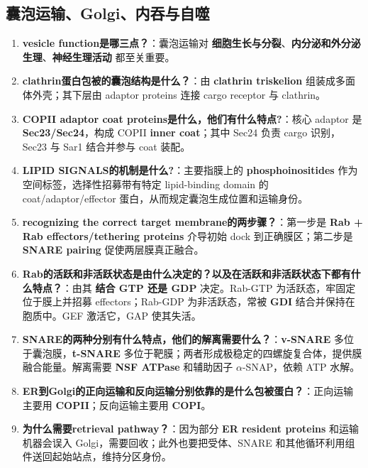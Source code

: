 \documentclass[12pt,fontset=none]{ctexart}
\begin{document}
\subsection*{囊泡运输、Golgi、内吞与自噬}
\begin{enumerate}
\item \textbf{vesicle function是哪三点？}：囊泡运输对 \textbf{细胞生长与分裂}、\textbf{内分泌和外分泌生理}、\textbf{神经生理活动} 都至关重要。

\item \textbf{clathrin蛋白包被的囊泡结构是什么？}：由 \textbf{clathrin triskelion} 组装成多面体外壳；其下层由 adaptor proteins 连接 cargo receptor 与 clathrin。

\item \textbf{COPII adaptor coat proteins是什么，他们有什么特点?}：核心 adaptor 是 \textbf{Sec23/Sec24}，构成 COPII \textbf{inner coat}；其中 Sec24 负责 cargo 识别，Sec23 与 Sar1 结合并参与 coat 装配。

\item \textbf{LIPID SIGNALS的机制是什么?}：主要指膜上的 \textbf{phosphoinositides} 作为空间标签，选择性招募带有特定 lipid-binding domain 的 coat/adaptor/effector 蛋白，从而规定囊泡生成位置和运输身份。

\item \textbf{recognizing the correct target membrane的两步骤？}：第一步是 \textbf{Rab + Rab effectors/tethering proteins} 介导初始 dock 到正确膜区；第二步是 \textbf{SNARE pairing} 促使两层膜真正融合。

\item \textbf{Rab的活跃和非活跃状态是由什么决定的？以及在活跃和非活跃状态下都有什么特点？}：由其 \textbf{结合 GTP 还是 GDP} 决定。Rab-GTP 为活跃态，牢固定位于膜上并招募 effectors；Rab-GDP 为非活跃态，常被 \textbf{GDI} 结合并保持在胞质中。GEF 激活它，GAP 使其失活。

\item \textbf{SNARE的两种分别有什么特点，他们的解离需要什么？}：\textbf{v-SNARE} 多位于囊泡膜，\textbf{t-SNARE} 多位于靶膜；两者形成极稳定的四螺旋复合体，提供膜融合能量。解离需要 \textbf{NSF ATPase} 和辅助因子 $\alpha$-SNAP，依赖 ATP 水解。

\item \textbf{ER到Golgi的正向运输和反向运输分别依靠的是什么包被蛋白？}：正向运输主要用 \textbf{COPII}；反向运输主要用 \textbf{COPI}。

\item \textbf{为什么需要retrieval pathway？}：因为部分 \textbf{ER resident proteins} 和运输机器会误入 Golgi，需要回收；此外也要把受体、SNARE 和其他循环利用组件送回起始站点，维持分区身份。


\end{enumerate}
\end{document}

